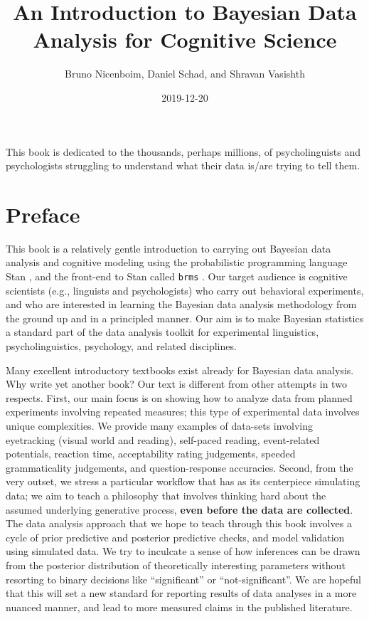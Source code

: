 \documentclass[12pt,]{krantz}
\title{An Introduction to Bayesian Data Analysis for Cognitive Science}
\author{Bruno Nicenboim, Daniel Schad, and Shravan Vasishth}
\date{2019-12-20}
\theoremstyle{definition}
\theoremstyle{definition}
\theoremstyle{definition}
\theoremstyle{remark}
\begin{document}
\maketitle

\thispagestyle{empty}
\begin{center}
This book is dedicated to the thousands, perhaps millions, of psycholinguists and psychologists struggling to understand what their data is/are trying to tell them.
\end{center}

\setlength{\abovedisplayskip}{-5pt}
\setlength{\abovedisplayshortskip}{-5pt}

{
\hypersetup{linkcolor=}
\setcounter{tocdepth}{2}
\tableofcontents
}
\listoftables
\listoffigures
\hypertarget{preface}{%
\chapter*{Preface}\label{preface}}


This book is a relatively gentle introduction to carrying out Bayesian data analysis and cognitive modeling using the probabilistic programming language Stan \citep{carpenter2017stan}, and the front-end to Stan called \texttt{brms} \citep{R-brms}. Our target audience is cognitive scientists (e.g., linguists and psychologists) who carry out behavioral experiments, and who are interested in learning the Bayesian data analysis methodology from the ground up and in a principled manner. Our aim is to make Bayesian statistics a standard part of the data analysis toolkit for experimental linguistics, psycholinguistics, psychology, and related disciplines.

Many excellent introductory textbooks exist already for Bayesian data analysis. Why write yet another book? Our text is different from other attempts in two respects. First, our main focus is on showing how to analyze data from planned experiments involving repeated measures; this type of experimental data involves unique complexities. We provide many examples of data-sets involving eyetracking (visual world and reading), self-paced reading, event-related potentials, reaction time, acceptability rating judgements, speeded grammaticality judgements, and question-response accuracies. Second, from the very outset, we stress a particular workflow that has as its centerpiece simulating data; we aim to teach a philosophy that involves thinking hard about the assumed underlying generative process, \textbf{even before the data are collected}. The data analysis approach that we hope to teach through this book involves a cycle of prior predictive and posterior predictive checks, and model validation using simulated data. We try to inculcate a sense of how inferences can be drawn from the posterior distribution of theoretically interesting parameters without resorting to binary decisions like ``significant'' or ``not-significant''. We are hopeful that this will set a new standard for reporting results of data analyses in a more nuanced manner, and lead to more measured claims in the published literature.
\end{document}
